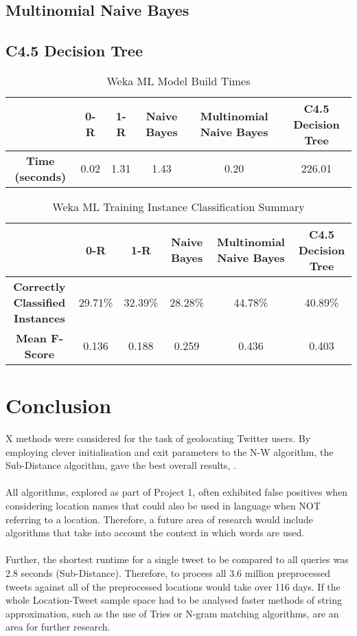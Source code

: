 \documentclass[11pt]{article}
\begin{document}
\subsection{Multinomial Naive Bayes}  

\subsection{C4.5 Decision Tree}

\begin{table} [ht]
\caption{Weka ML Model Build Times}
\centering
	\begin{tabular}{| c | c | c | c | c | c |}
	\hline
	 & \textbf{0-R} & \textbf{1-R} & \textbf{Naive Bayes} & \textbf{Multinomial Naive Bayes} &\textbf{C4.5 Decision Tree}  \\
	\hline
	\textbf{Time (seconds)} & 0.02 & 1.31 & 1.43 & 0.20 & 226.01\\
	\hline
	\end{tabular}
\label{table:run-table}
\end{table}

\begin{table} [th]
\caption{Weka ML Training Instance Classification Summary}
\centering
	\begin{tabular}{| c | c | c | c | c | c |}
	\hline
	 & \textbf{0-R} & \textbf{1-R} & \textbf{Naive Bayes} & \textbf{Multinomial Naive Bayes} &\textbf{C4.5 Decision Tree}  \\
	\hline
	\textbf{Correctly Classified Instances} & 29.71\% & 32.39\% & 28.28\% & 44.78\% & 40.89\%\\
	\hline
	\textbf{Mean F-Score} & 0.136 & 0.188 & 0.259 & 0.436 & 0.403 \\
	\hline
	\end{tabular}
\label{table:eval-table}
\end{table}

\section{Conclusion}

X methods were considered for the task of geolocating Twitter users. By employing clever initialisation and exit parameters to the N-W algorithm, the Sub-Distance algorithm, gave the best overall results, .\\\\
All algorithms, explored as part of Project 1, often exhibited false positives when considering location names that could also be used in language when NOT referring to a location. Therefore, a future area of research would include algorithms that take into account the context in which words are used.\\\\
Further, the shortest runtime for a single tweet to be compared to all queries was 2.8 seconds (Sub-Distance). Therefore, to process all 3.6 million preprocessed tweets against all of the preprocessed locations would take over 116 days. If the whole Location-Tweet sample space had to be analysed faster methods of string approximation, such as the use of Tries or N-gram matching algorithms, are an area for further research. 



\end{document}
